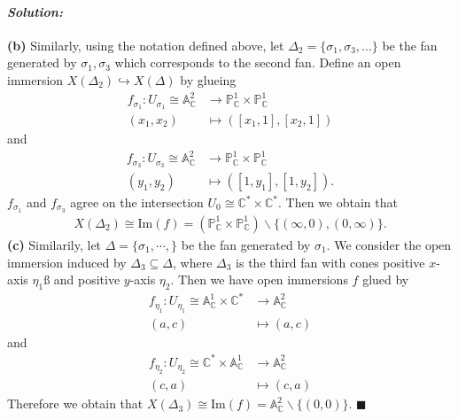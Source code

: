 \documentclass[12pt, a4paper]{article}
\newenvironment{solution}
  {\paragraph{\textit{Solution:}}\par\medskip}
  {\hfill$\blacksquare$\vspace{0.1cm}}
\begin{document}
\begin{solution}
    \textbf{(b)}
    Similarly, using the notation defined above, let $\Delta_2= \{\sigma_1,\sigma_3,\dots\}$ be the fan generated by $\sigma_1,\sigma_3$ which corresponds to the second fan.
    Define an open immersion $X(\Delta_2)\hookrightarrow X(\Delta)$ by glueing
    \begin{align*}
        f_{\sigma_1}:U_{\sigma_1}\cong \mathbb{A}^2_\mathbb{C} &\to \mathbb{P}^1_{\mathbb{C}} \times \mathbb{P}^1_{\mathbb{C}} \\ (x_1,x_2)&\mapsto ([x_1,1],[x_2,1])
    \end{align*}
    and 
    \begin{align*}
        f_{\sigma_3}:U_{\sigma_3}\cong \mathbb{A}^2_\mathbb{C} &\to \mathbb{P}^1_{\mathbb{C}} \times \mathbb{P}^1_{\mathbb{C}} \\ (y_1,y_2)&\mapsto ([1,y_1],[1,y_2]).
    \end{align*}
    $f_{\sigma_1}$ and $f_{\sigma_3}$ agree on the intersection $U_{0}\cong \mathbb{C}^*\times \mathbb{C}^*$. 
    Then we obtain that 
    \begin{align*}
        X(\Delta_2) \cong \text{Im}(f) = (\mathbb{P}^1_{\mathbb{C}} \times \mathbb{P}^1_{\mathbb{C}})\backslash \{(\infty,0),(0,\infty)\}.
    \end{align*}
    \textbf{(c)}  Similarily, let $\Delta=\{\sigma_1,\cdots,\}$ be the fan generated by $\sigma_1$.
    We consider the open immersion induced by $\Delta_3\subseteq \Delta$, where $\Delta_3$ is the third fan with cones positive $x$-axis $\eta_1ß$ and positive $y$-axis $\eta_2$.
    Then we have open immersions $f$ glued by 
    \begin{align*}
        f_{\eta_1}: U_{\eta_1}\cong \mathbb{A}_{\mathbb{C}}^1 \times \mathbb{C}^* &\to \mathbb{A}_{\mathbb{C}}^2 \\
        (a,c) &\mapsto (a,c) 
    \end{align*}
    and 
        \begin{align*}
        f_{\eta_2}: U_{\eta_2}\cong \mathbb{C}^*  \times  \mathbb{A}_{\mathbb{C}}^1&\to \mathbb{A}_{\mathbb{C}}^2 \\
        (c,a) &\mapsto (c,a) 
    \end{align*}
    Therefore we obtain that $X(\Delta_3)\cong \text{Im}(f)=\mathbb{A}^2_{\mathbb{C}} \backslash \{(0,0)\}$.
\end{solution}
\end{document}
